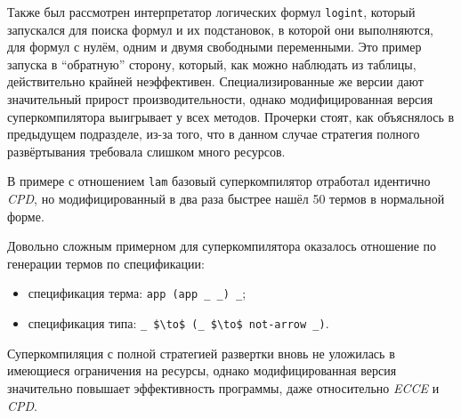 Также был рассмотрен интерпретатор логических формул \lstinline{logint}, который
запускался для поиска формул и их подстановок, в которой они выполняются, для
формул с нулём, одним и двумя свободными переменными. Это пример запуска в ``обратную''
сторону, который, как можно наблюдать из таблицы, действительно крайней неэффективен.
Специализированные же версии дают значительный прирост производительности, однако
модифицированная версия суперкомпилятора выигрывает у всех методов. Прочерки стоят,
как объяснялось в предыдущем подразделе, из-за того, что в данном случае стратегия
полного развёртывания требовала слишком много ресурсов.

В примере с отношением \lstinline{lam} базовый суперкомпилятор отработал
идентично \textit{CPD}, но модифицированный в два раза быстрее нашёл 50 термов
в нормальной форме.

Довольно сложным примерном для суперкомпилятора оказалось отношение
по генерации термов по спецификации:
\begin{itemize}
\item спецификация терма: \lstinline{app (app _ _) _};
\item спецификация типа: \lstinline{_ $\to$ (_ $\to$ not-arrow _)}.
\end{itemize}

Суперкомпиляция с полной стратегией развертки вновь не уложилась в имеющиеся ограничения
на ресурсы, однако модифицированная версия значительно повышает эффективность программы,
даже относительно \textit{ECCE} и \textit{CPD}.


